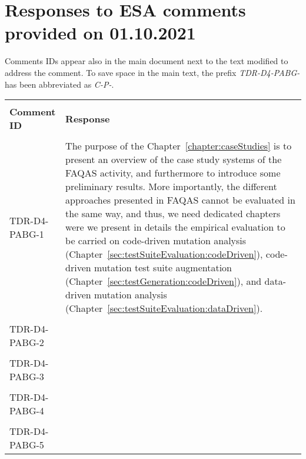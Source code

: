 
\section{Responses to ESA comments provided on 01.10.2021}
\label{sec:ESA:comments:1}

Comments IDs appear also in the main document next to the text modified to address the comment. To save space in the main text, the prefix \emph{TDR-D4-PABG-} has been abbreviated as \emph{C-P-}.

\setlength\LTleft{0pt}
\setlength\LTright{0pt}
\tiny 
\begin{longtable}{|p{2cm}|p{12cm}|@{}} 
\hline
\\
\textbf{Comment ID}&\textbf{Response}\\
\\
\hline
TDR-D4-PABG-1&
\begin{minipage}{12cm}
The purpose of the Chapter~\ref{chapter:caseStudies} is to present an overview of the case study systems of the FAQAS activity, and furthermore to introduce some preliminary results. More importantly, the different approaches presented in FAQAS cannot be evaluated in the same way, and thus, we need dedicated chapters were we present in details the empirical evaluation to be carried on code-driven mutation analysis (Chapter~\ref{sec:testSuiteEvaluation:codeDriven}), code-driven mutation test suite augmentation (Chapter~\ref{sec:testGeneration:codeDriven}), and data-driven mutation analysis (Chapter~\ref{sec:testSuiteEvaluation:dataDriven}).
\end{minipage}\\
\\
\hline  
TDR-D4-PABG-2&
\begin{minipage}{12cm}
\end{minipage}\\
\\
\hline  
TDR-D4-PABG-3&
\begin{minipage}{12cm}
\end{minipage}\\
\\
\hline  
TDR-D4-PABG-4&
\begin{minipage}{12cm}
\end{minipage}\\
\\
\hline  
TDR-D4-PABG-5&
\begin{minipage}{12cm}
\end{minipage}\\

\end{longtable}
